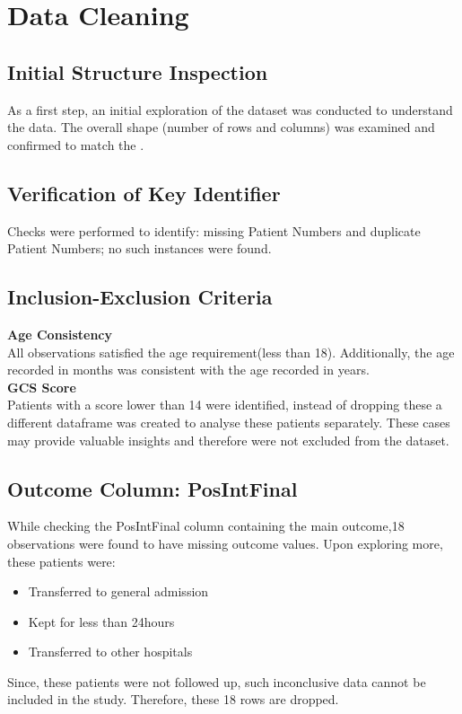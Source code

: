 \documentclass[11pt]{article}
\begin{document}
\section{Data Cleaning}
    \subsection{Initial Structure Inspection}
    As a first step, an initial exploration of the dataset was conducted to understand the data. The overall shape (number of rows and columns) was examined and confirmed to match the \cite{kuppermann2009identification}. \\    
    \subsection{Verification of Key Identifier}
    Checks were performed to identify: missing Patient Numbers and duplicate Patient Numbers; no such instances were found.
    \subsection{Inclusion-Exclusion Criteria}
    \textbf{Age Consistency}\\
    All observations satisfied the age requirement(less than 18). Additionally, the age recorded in months was consistent with the age recorded in years.\\
    \textbf{GCS Score}\\
    Patients with a score lower than 14 were identified, instead of dropping these a different dataframe was created to analyse these patients separately. These cases may provide valuable insights and therefore were not excluded from the dataset.
    \subsection{Outcome Column: PosIntFinal}
    While checking the PosIntFinal column containing the main outcome,18 observations were found to have missing outcome values.
    Upon exploring more, these patients were:
    \begin{itemize}
    \item Transferred to general admission
    \item Kept for less than 24hours 
    \item Transferred to other hospitals
    \end{itemize}
    Since, these patients were not followed up, such inconclusive data cannot be included in the study. Therefore, these 18 rows are dropped.
\end{document}
